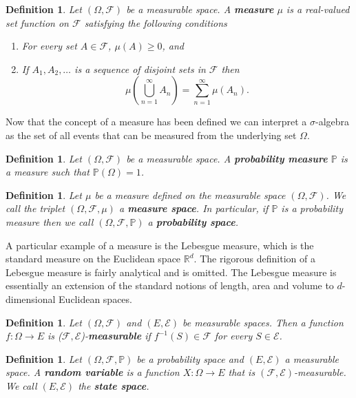 \documentclass[honours,12pt,twoside, openright]{unswthesis}
\newcommand{\R}{\mathbb{R}}
\newcommand{\PP}{\mathbb{P}}
\newcommand{\1}{\mathbf 1}
\newcommand{\FF}{\mathcal{F}}
\newtheorem{definition}[equation]{Definition}
\numberwithin{equation}{section}
\theoremstyle{definition}
\theoremstyle{remark}
\begin{document}
\begin{definition}
Let $(\Omega,\FF)$ be a measurable space. A \textbf{measure} $\mu$ is a real-valued set function on $\FF$ satisfying the following conditions
\begin{enumerate}
\item For every set $A\in \FF$, $\mu(A) \geq 0$, and
\item If $A_1, A_2,\ldots$ is a sequence of disjoint sets in $\FF$ then 
\[
\mu\left(\bigcup_{n=1}^\infty A_n\right) = \sum_{n=1}^\infty \mu(A_n).
\]
\end{enumerate}
\end{definition}
\noindent Now that the concept of a measure has been defined we can interpret a $\sigma$-algebra as the set of all events that can be measured from the underlying set $\Omega$.\\
\begin{definition}
Let $(\Omega,\FF)$ be a measurable space. A \textbf{probability measure} $\PP$ is a measure such that $\PP(\Omega) = 1$.\\
\end{definition}
\begin{definition}
Let $\mu$ be a measure defined on the measurable space $(\Omega,\FF)$. We call the triplet $(\Omega,\FF,\mu)$ a \textbf{measure space}. In particular, if $\PP$ is a probability measure then we call $(\Omega,\FF,\PP)$ a \textbf{probability space}.\\
\end{definition}


A particular example of a measure is the Lebesgue measure, which is the standard measure on the Euclidean space $\R^d$. The rigorous definition of a Lebesgue measure is fairly analytical and is omitted. The Lebesgue measure is essentially an extension of the standard notions of length, area and volume to $d$-dimensional Euclidean spaces.\\


\begin{definition}
Let $(\Omega,\FF)$ and $(E,\mathcal{E})$ be measurable spaces. Then a function $f: \Omega \rightarrow E$ is ($\FF,\mathcal{E}$)-\textbf{measurable} if $f^{-1}(S)\in \FF$ for every $S\in \mathcal{E}$.\\
\end{definition}

\begin{definition}
Let $(\Omega,\FF,\PP)$ be a probability space and $(E,\mathcal{E})$ a measurable space. A \textbf{random variable} is a function $X:\Omega \rightarrow E$ that is $(\FF,\mathcal{E})$-measurable. We call $(E,\mathcal{E})$ the \textbf{state space}. \\
\end{definition}
\end{document}
